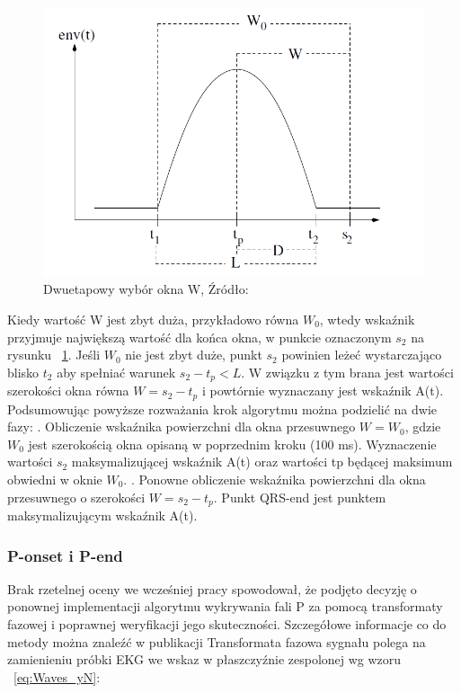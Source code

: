 \begin{description}
\begin{figure}[h]
\centering
\includegraphics[width=\textwidth,keepaspectratio] {Waves/img/W0.png}
\caption{Dwuetapowy wybór okna W, Źródło: \cite{Waves_QRSAlg}}
\label{fig:Waves_W0}
\end{figure}
Kiedy wartość W jest zbyt duża, przykładowo równa $W_0$, wtedy wskaźnik przyjmuje największą wartość dla końca okna, w punkcie oznaczonym $s_2$ na rysunku ~\ref{fig:Waves_W0}. Jeśli $W_0$  nie jest zbyt duże, punkt $s_2$ powinien leżeć wystarczająco blisko $t_2$ aby spełniać warunek $s_2 - t_p < L$. W związku z tym brana jest wartości szerokości okna równa $W = s_2 - t_p$ i powtórnie wyznaczany jest wskaźnik A(t).
Podsumowując powyższe rozważania krok algorytmu można podzielić na dwie fazy: . Obliczenie wskaźnika powierzchni dla okna przesuwnego $W=W_0$, gdzie $W_0$ jest szerokością okna opisaną w poprzednim kroku (100 ms). Wyznaczenie wartości $s_2$ maksymalizującej wskaźnik A(t) oraz wartości tp będącej maksimum obwiedni w oknie $W_0$. . Ponowne obliczenie wskaźnika powierzchni dla okna przesuwnego o szerokości $W= s_2 - t_p$. Punkt QRS-end jest punktem maksymalizującym wskaźnik A(t).
\end{description}

\subsubsection{P-onset i P-end}
Brak rzetelnej oceny we wcześniej pracy \cite{Waves_ProjZeszlyRok} spowodował, że podjęto decyzję o ponownej implementacji algorytmu wykrywania fali P za pomocą transformaty fazowej i poprawnej weryfikacji jego skuteczności. Szczegółowe informacje co do metody można znaleźć w publikacji \cite{Waves_aNMfADoEFPBotPT}
Transformata fazowa sygnału polega na zamienieniu próbki EKG we wskaz w płaszczyźnie zespolonej wg wzoru ~\ref{eq:Waves_yN}:

